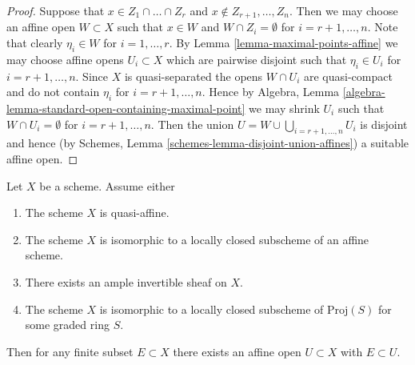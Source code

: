 \begin{proof}
Suppose that $x \in Z_1 \cap \ldots \cap Z_r$ and
$x \not \in Z_{r + 1}, \ldots, Z_n$. Then we may choose
an affine open $W \subset X$ such that
$x \in W$ and $W \cap Z_i = \emptyset$ for
$i = r + 1, \ldots, n$. Note that clearly $\eta_i \in W$
for $i = 1, \ldots, r$. By Lemma \ref{lemma-maximal-points-affine}
we may choose affine opens $U_i \subset X$ which are pairwise
disjoint such that $\eta_i \in U_i$ for $i = r + 1, \ldots, n$.
Since $X$ is quasi-separated the opens $W \cap U_i$
are quasi-compact and do not contain $\eta_i$ for
$i = r + 1, \ldots, n$. Hence by
Algebra, Lemma \ref{algebra-lemma-standard-open-containing-maximal-point}
we may shrink $U_i$ such that $W \cap U_i = \emptyset$
for $i = r + 1, \ldots, n$. Then the union
$U = W \cup \bigcup_{i = r + 1, \ldots, n} U_i$ is disjoint and hence
(by Schemes, Lemma \ref{schemes-lemma-disjoint-union-affines})
a suitable affine open.
\end{proof}

\begin{lemma}
\label{lemma-ample-finite-set-in-affine}
Let $X$ be a scheme. Assume either
\begin{enumerate}
\item The scheme $X$ is quasi-affine.
\item The scheme $X$ is isomorphic to a locally closed subscheme
of an affine scheme.
\item There exists an ample invertible sheaf on $X$.
\item The scheme $X$ is isomorphic to a locally closed subscheme
of $\text{Proj}(S)$ for some graded ring $S$.
\end{enumerate}
Then for any finite subset $E \subset X$ there exists an
affine open $U \subset X$ with $E \subset U$.
\end{lemma}

